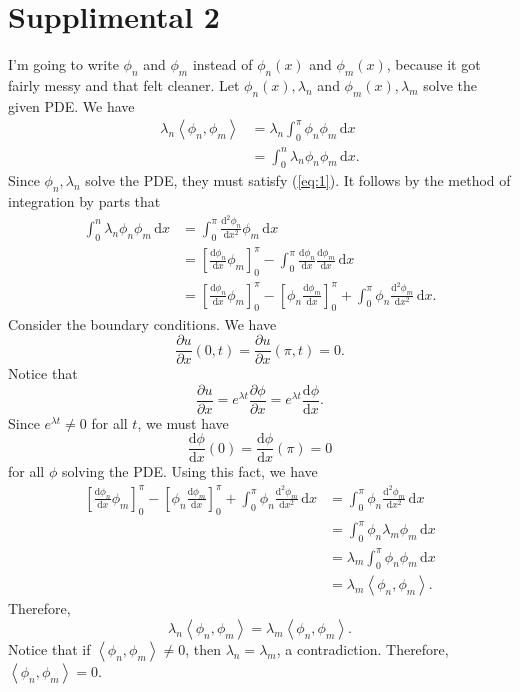 \documentclass[11pt, letterpaper]{report}
\begin{document}
\section*{Supplimental 2}
I'm going to write $\phi_n$ and $\phi _m$ instead of $\phi _n(x)$ and $\phi _m(x)$, because it got fairly messy and that felt cleaner. Let $\phi_n(x),\lambda_n$ and $\phi_m(x),\lambda_m$ solve the given PDE. We have
\begin{align*}
	\lambda_n \left<\phi_n,\phi_m \right> &=\lambda_n\int_{0}^{\pi } \phi _n\phi _m  \,\mathrm{d} x\\
						    &=\int_{0}^{n} \lambda _n\phi _n\phi _m \,\mathrm{d} x
.\end{align*}
Since $\phi _n,\lambda _n$ solve the PDE, they must satisfy (\ref{eq:1}). It follows by the method of integration by parts that
\begin{align*}
	\int_{0}^{n} \lambda _n\phi _n\phi _m \,\mathrm{d} x&=\int_{0}^{\pi } \frac{\mathrm{d}  ^2\phi _n}{\mathrm{d}  x^2} \phi _m \,\mathrm{d} x\\
								  &=\left[ \frac{\mathrm{d}\phi _n}{\mathrm{d}x} \phi _m \right]_0^\pi -\int_{0}^{\pi } \frac{\mathrm{d}\phi _n}{\mathrm{d}x} \frac{\mathrm{d}\phi _m}{\mathrm{d}x}  \,\mathrm{d} x\\
								  &=\left[ \frac{\mathrm{d}\phi _n}{\mathrm{d}x} \phi _m \right]_0^\pi -\left[ \phi_n \frac{\mathrm{d}\phi _m}{\mathrm{d}x}  \right]_0^\pi +\int_{0}^{\pi } \phi_n\frac{\mathrm{d}^2\phi _m}{\mathrm{d}x^2}  \,\mathrm{d} x
.\end{align*}
Consider the boundary conditions. We have
\[
	\frac{\partial u}{\partial x} (0,t)=\frac{\partial u}{\partial x} (\pi ,t)=0
.\]
Notice that
\[
	\frac{\partial u}{\partial x} =e^{\lambda t}\frac{\partial \phi }{\partial x} =e^{\lambda t}\frac{\mathrm{d}\phi }{\mathrm{d}x} 
.\]
Since $e^{\lambda t}\neq 0$ for all $t$, we must have
\[
	\frac{\mathrm{d}\phi }{\mathrm{d}x} (0)=\frac{\mathrm{d}\phi }{\mathrm{d}x} (\pi )=0
\]
for all $\phi $ solving the PDE. Using this fact, we have
\begin{align*}
	\left[ \frac{\mathrm{d}\phi _n}{\mathrm{d}x} \phi _m \right]_0^\pi -\left[ \phi_n \frac{\mathrm{d}\phi _m}{\mathrm{d}x}  \right]_0^\pi +\int_{0}^{\pi } \phi_n\frac{\mathrm{d}^2\phi _m}{\mathrm{d}x^2}  \,\mathrm{d} x&=\int_{0}^{\pi } \phi _n \frac{\mathrm{d}^2\phi _m}{\mathrm{d}x^2}  \,\mathrm{d} x\\
																												  &=\int_{0}^{\pi } \phi_n \lambda _m \phi _m \,\mathrm{d} x\\
																												  &=\lambda_m \int_{0}^{\pi } \phi _n\phi _m \,\mathrm{d} x\\
																												  &=\lambda _m \left<\phi _n,\phi _m \right>	
.\end{align*}
Therefore,
\[
	\lambda_n \left<\phi _n,\phi _m \right> = \lambda_m \left<\phi _n,\phi _m \right>
.\]
Notice that if $\left<\phi _n,\phi _m \right>\neq 0$, then $\lambda _n=\lambda _m$, a contradiction. Therefore, $\left<\phi _n,\phi _m \right> = 0$.
\end{document}
